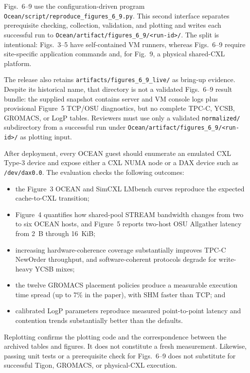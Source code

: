 \documentclass[conference]{IEEEtran}
\begin{document}
Figs.~6--9 use the configuration-driven program
\texttt{Ocean/script/reproduce\_figures\_6\_9.py}.  This second interface
separates prerequisite checking, collection, validation, and plotting and
writes each successful run to
\texttt{Ocean/artifact/figures\_6\_9/<run-id>/}.  The split is intentional:
Figs.~3--5 have self-contained VM runners, whereas Figs.~6--9 require
site-specific application commands and, for Fig.~9, a physical shared-CXL
platform.

The release also retains \texttt{artifacts/figures\_6\_9\_live/} as
bring-up evidence.  Despite its historical name, that directory is not a
validated Figs.~6--9 result bundle: the supplied snapshot contains server and
VM console logs plus provisional Figure~5 TCP/OSU diagnostics, but no complete
TPC-C, YCSB, GROMACS, or LogP tables.  Reviewers must use only a validated
\texttt{normalized/} subdirectory from a successful run under
\texttt{Ocean/artifact/figures\_6\_9/<run-id>/} as plotting input.

\artexp

After deployment, every OCEAN guest should enumerate an emulated CXL Type-3
device and expose either a CXL NUMA node or a DAX device such as
\texttt{/dev/dax0.0}.  The evaluation checks the following outcomes:
\begin{itemize}
  \item the Figure~3 OCEAN and SimCXL LMbench curves reproduce the expected
  cache-to-CXL transition;
  \item Figure~4 quantifies how shared-pool STREAM bandwidth changes from two
  to six OCEAN hosts, and Figure~5 reports two-host OSU Allgather latency from
  2~B through 16~KiB;
  \item increasing hardware-coherence coverage substantially improves TPC-C
  NewOrder throughput, and software-coherent protocols degrade for
  write-heavy YCSB mixes;
  \item the twelve GROMACS placement policies produce a measurable execution
  time spread (up to 7\% in the paper), with SHM faster than TCP; and
  \item calibrated LogP parameters reproduce measured point-to-point latency
  and contention trends substantially better than the defaults.
\end{itemize}
Replotting confirms the plotting code and the correspondence between the
archived tables and figures.  It does not constitute a fresh measurement.
Likewise, passing unit tests or a prerequisite check for Figs.~6--9 does not
substitute for successful Tigon, GROMACS, or physical-CXL execution.
\end{document}
